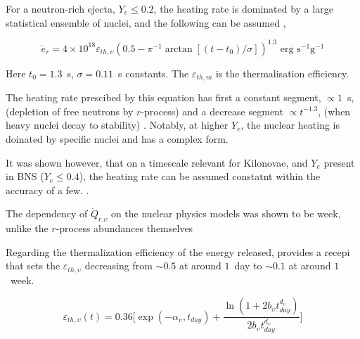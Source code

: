 \documentclass[11pt,a4paper,headinclude=true,DIV=14,BCOR=8mm,chapterprefix,listof=totoc,twoside,openright,abstracton]{scrbook}
\begin{document}
For a neutron-rich ejecta, $Y_e\leq0.2$, the heating rate is dominated by a large statistical ensemble of nuclei, and the following can be assumed \cite{Korobkin et al 2012},

\begin{equation}
    \dot{e}_r = 4\times 10^{18} \varepsilon_{th,\upsilon}(0.5 - \pi^{-1} \arctan[(t-t_0)/\sigma])^{1.3} \text{ erg } \text{s}^{-1} \text{g}^{-1}
\end{equation}

Here $t_0=1.3$~s, $\sigma=0.11$~s constants. The $\varepsilon_{th,m}$ is the thermalisation efficiency.

The heating rate prescibed by this equation has first a constant segment, $\propto1$~s, (depletion of free neutrons by $r$-process) and a decrease segment $\propto t^{-1.3}$, (when heavy nuclei decay to stability) \cite{(Metzger et al 2010b; Roberts et al 2011)}. 
Notably, at higher $Y_e$, the nuclear heating is doinated by specific nuclei and has a complex form.

It was shown however, that on a timescale relevant for Kilonovae, and $Y_e$ present in BNS ($Y_e\leq0.4$), the heating rate can be assumed constatnt within the accuracy of a few. \cite{(Lippuner and Roberts 2015, their Fig. 7)}.

The dependency of $\dot{Q}_{r.\upsilon}$ on the nuclear physics models was shown to be week, unlike the $r$-process abundances themselves \cite{Eichler et al 2015; Wu et al 2016; Mumpower et al 2016).}

Regarding the thermalization efficiency of the energy released, \cite{Barnes et al (2016)} provides a recepi that sets the $\varepsilon_{th,\upsilon}$ decreasing from $\sim0.5$ at around $1$~day to $\sim0.1$ at around $1$~week. 

\begin{equation}
    \varepsilon_{th,\upsilon}(t) = 0.36 \Bigg[ \exp(-\alpha_{\upsilon}, t_{day}) + \frac{\ln(1+2b_{\upsilon} t_{day}^{d_{\upsilon}})}{2b_{\upsilon}t_{day}^{d_{\upsilon}}} \Bigg]
\end{equation}


\newpage


\end{document}
